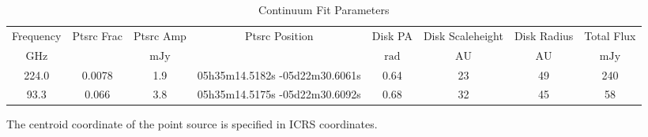 \begin{table*}[htp]
\centering
\caption{Continuum Fit Parameters}
\begin{tabular}{cccccccc}
\label{tab:continuum_fit_parameters}
Frequency & Ptsrc Frac & Ptsrc Amp & Ptsrc Position & Disk PA & Disk Scaleheight & Disk Radius & Total Flux \\
$\mathrm{GHz}$ & $\mathrm{}$ & $\mathrm{mJy}$ &  & $\mathrm{rad}$ & $\mathrm{AU}$ & $\mathrm{AU}$ & $\mathrm{mJy}$ \\
\hline
224.0 & 0.0078 & 1.9 & 05h35m14.5182s -05d22m30.6061s & 0.64 & 23 & 49 & 240 \\
93.3 & 0.066 & 3.8 & 05h35m14.5175s -05d22m30.6092s & 0.68 & 32 & 45 & 58 \\
\hline
\end{tabular}

\par The centroid coordinate of the point source is specified in ICRS coordinates.
\end{table*}
